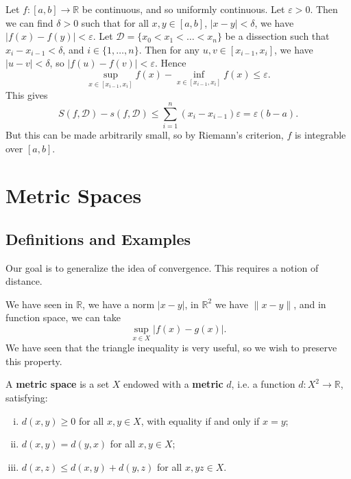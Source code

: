\documentclass[12pt]{article}
\begin{document}
\begin{proofbox}
	Let $f : [a, b] \to \mathbb{R}$ be continuous, and so uniformly continuous. Let $\varepsilon > 0$. Then we can find $\delta > 0$ such that for all $x, y \in [a, b]$, $|x - y| < \delta$, we have $|f(x) - f(y)| < \varepsilon$. Let $\mathcal{D} = \{x_0 < x_1 < \ldots < x_n\}$ be a dissection such that $x_{i} - x_{i-1} < \delta$, and $i \in \{1, \ldots, n\}$. Then for any $u, v \in [x_{i-1}, x_i]$, we have $|u - v| < \delta$, so $|f(u) - f(v)| < \varepsilon$. Hence
	\[
		\sup_{x \in [x_{i-1}, x_i]} f(x) - \inf_{x \in [x_{i-1}, x_i]} f(x) \leq \varepsilon
	.\]
	This gives
	\[
		S(f, \mathcal{D}) - s(f, \mathcal{D}) \leq \sum_{i = 1}^{n}(x_i - x_{i-1})\varepsilon = \varepsilon(b - a)
	.\]
	But this can be made arbitrarily small, so by Riemann's criterion, $f$ is integrable over $[a, b]$.
\end{proofbox}

\newpage

\section{Metric Spaces}%
\label{sec:metric_spaces}

\subsection{Definitions and Examples}%
\label{sub:definitions_and_examples}

Our goal is to generalize the idea of convergence. This requires a notion of distance.

We have seen in $\mathbb{R}$, we have a norm $|x - y|$, in $\mathbb{R}^2$ we have $\|x - y\|$, and in function space, we can take
\[
	\sup_{x \in X}|f(x) - g(x)|
.\]
We have seen that the triangle inequality is very useful, so we wish to preserve this property.

\begin{definition}
	A \textbf{metric space} is a set $X$ endowed with a \textbf{metric} $d$, i.e. a function $d : X^2 \to \mathbb{R}$, satisfying:
	\begin{enumerate}[(i)]
		\item $d(x, y) \geq 0$ for all $x, y \in X$, with equality if and only if $x = y$;
		\item $d(x, y) = d(y, x)$ for all $x, y \in X$;
		\item $d(x, z) \leq d(x, y) + d(y, z)$ for all $x, y z \in X$.
	\end{enumerate}
\end{definition}
\end{document}
